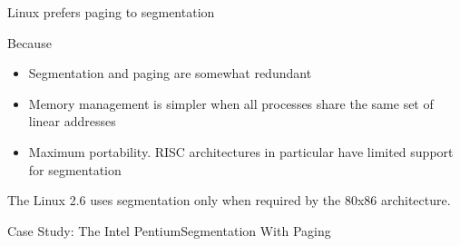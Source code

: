 \begin{frame}{Linux prefers paging to segmentation}
  \begin{iblock}{Because}
  \begin{itemize}
  \item Segmentation and paging are somewhat redundant
  \item Memory management is simpler when all processes share the same set of linear addresses
  \item Maximum portability. RISC architectures in particular have limited support for segmentation
  \end{itemize}
  \end{iblock}
  The Linux 2.6 uses segmentation only when required by the 80x86 architecture.
\end{frame}



\begin{frame}{Case Study: The Intel Pentium}{Segmentation With Paging}
  \begin{center}
  \end{center}
  \vspace{1em}
  \begin{minipage}{.3\linewidth}
    \begin{center}
    \end{center}
  \end{minipage}\hfill
  \begin{minipage}{.6\linewidth}
    \begin{center}
    \end{center}
  \end{minipage}
\end{frame}

